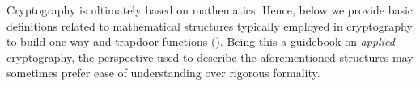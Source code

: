 Cryptography is ultimately based on mathematics. Hence, below we provide basic definitions related to mathematical structures typically employed in cryptography to build one-way and trapdoor functions (). Being this a guidebook on \textit{applied} cryptography, the perspective used to describe the aforementioned structures may sometimes prefer ease of understanding over rigorous formality.
